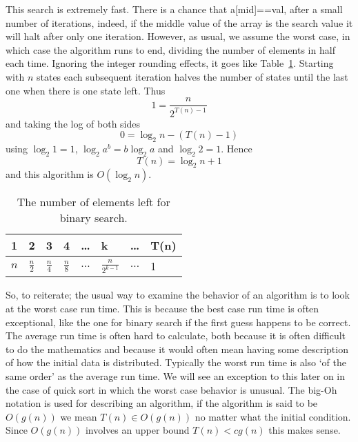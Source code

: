 \documentclass[11pt,a4paper]{scrartcl}
\begin{document}
This search is extremely fast. There is a chance that a[mid]==val,
after a small number of iterations, indeed, if the middle value of the
array is the search value it will halt after only one
iteration. However, as usual, we assume the worst case, in which case
the algorithm runs to end, dividing the number of elements in half
each time. Ignoring the integer rounding effects, it goes like
Table~\ref{tab_binary_search}. Starting with $n$ states each
subsequent iteration halves the number of states until the last one
when there is one state left. Thus
\begin{equation}
1=\frac{n}{2^{T(n)-1}}
\end{equation}
and taking the log of both sides
\begin{equation}
0=\log_2{n}-(T(n)-1)
\end{equation}
using $\log_2{1}=1$, $\log_2{a^b}=b\log_2{a}$ and $\log_2{2}=1$. Hence
\begin{equation}
T(n)=\log_2{n}+1
\end{equation}
and this algorithm is $O(\log_2{n})$.

\begin{table}
\begin{center}
\begin{tabular}{llllllll}
1&2&3&4&\ldots&k&\ldots&T(n)\\
\hline
$n$&$\frac{n}{2}$&$\frac{n}{4}$&$\frac{n}{8}$&$\ldots$&$\frac{n}{2^{k-1}}$&$\ldots$&1
\end{tabular}
\end{center}
\caption{The number of elements left for binary search.\label{tab_binary_search}}
\end{table}


So, to reiterate; the usual way to examine the behavior of an
algorithm is to look at the worst case run time. This is because the
best case run time is often exceptional, like the one for binary
search if the first guess happens to be correct. The average run time
is often hard to calculate, both because it is often difficult to do
the mathematics and because it would often mean having some
description of how the initial data is distributed. Typically the
worst run time is also \lq{}of the same order\rq{} as the average run
time. We will see an exception to this later on in the case of quick
sort in which the worst case behavior is unusual. The big-Oh notation
is used for describing an algorithm, if the algorithm is said to be
$O(g(n))$ we mean $T(n)\in O(g(n))$ no matter what the initial
condition. Since $O(g(n))$ involves an upper bound $T(n)<cg(n)$ this
makes sense.
 
\end{document}
